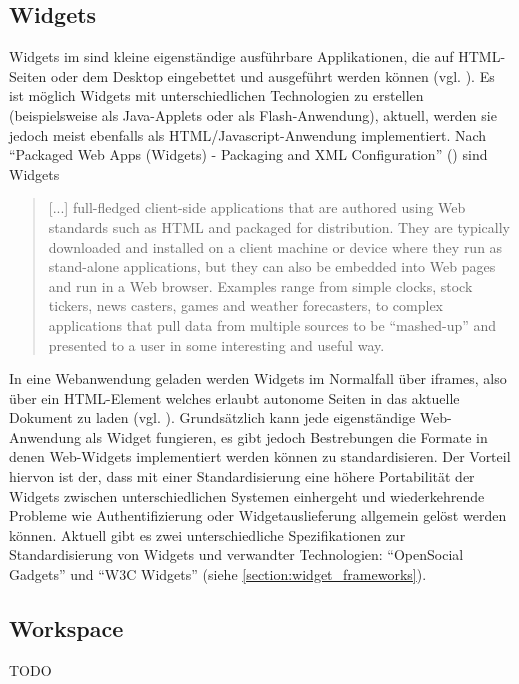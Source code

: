 \subsection{Widgets}\label{section:widgets}
Widgets im sind kleine eigenständige ausführbare Applikationen, die auf HTML-Seiten oder dem Desktop eingebettet und ausgeführt werden können (vgl. \cite{Taraghi2010}). Es ist möglich Widgets mit unterschiedlichen Technologien zu erstellen (beispielsweise als Java-Applets oder als Flash-Anwendung), aktuell, werden sie jedoch meist ebenfalls als HTML/Javascript-Anwendung implementiert. Nach "`Packaged Web Apps (Widgets) - Packaging and XML Configuration"' (\cite{W3C-11-2012}) sind Widgets
\begin{quotation}[...] full-fledged client-side applications that are authored using Web standards such as HTML and packaged for distribution. They are typically downloaded and installed on a client machine or device where they run as stand-alone applications, but they can also be embedded into Web pages and run in a Web browser. Examples range from simple clocks, stock tickers, news casters, games and weather forecasters, to complex applications that pull data from multiple sources to be "`mashed-up"' and presented to a user in some interesting and useful way.\end{quotation}
In eine Webanwendung geladen werden Widgets im Normalfall über iframes, also über ein HTML-Element welches erlaubt autonome Seiten in das aktuelle Dokument zu laden (vgl. \cite{W3C1999}). Grundsätzlich kann jede eigenständige Web-Anwendung als Widget fungieren, es gibt jedoch Bestrebungen die Formate in denen Web-Widgets implementiert werden können zu standardisieren. Der Vorteil hiervon ist der, dass mit einer Standardisierung eine höhere Portabilität der Widgets zwischen unterschiedlichen Systemen einhergeht und wiederkehrende Probleme wie Authentifizierung oder Widgetauslieferung allgemein gelöst werden können. Aktuell gibt es zwei unterschiedliche Spezifikationen zur Standardisierung von Widgets und verwandter Technologien: "`OpenSocial Gadgets"' und "`W3C Widgets"' (siehe \ref{section:widget_frameworks}).

\subsection{Workspace}
TODO